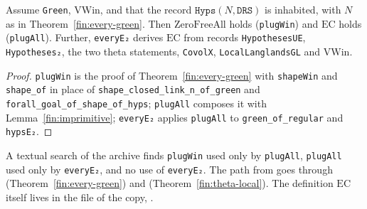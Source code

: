 \begin{theorem}\label{fin:plug}
Assume \texttt{Green}, $\mathrm{VWin}$, and that the record
$\texttt{Hyps}(N,\texttt{DRS})$ is inhabited, with $N$ as in
Theorem~\ref{fin:every-green}. Then $\mathrm{ZeroFreeAll}$ holds
(\texttt{plugWin}) and $\mathrm{EC}$ holds (\texttt{plugAll}). Further,
\texttt{everyE₂} derives $\mathrm{EC}$ from records \texttt{HypothesesUE},
\texttt{Hypotheses₂}, the two theta statements, \texttt{CovolX},
\texttt{LocalLanglandsGL} and $\mathrm{VWin}$.
\end{theorem}
\begin{proof}
\texttt{plugWin} is the proof of Theorem~\ref{fin:every-green} with
\texttt{shapeWin} and \texttt{shape\_of} in place of
\texttt{shape\_closed\_link\_n\_of\_green} and
\texttt{forall\_goal\_of\_shape\_of\_hyps}; \texttt{plugAll} composes it with
Lemma~\ref{fin:imprimitive}; \texttt{everyE₂} applies \texttt{plugAll} to
\texttt{green\_of\_regular} and \texttt{hypsE₂}.
\end{proof}

\begin{remark}\label{fin:rem-deadcopy}
A textual search of the archive finds \texttt{plugWin} used only by
\texttt{plugAll}, \texttt{plugAll} used only by \texttt{everyE₂}, and no use of
\texttt{everyE₂}. The path from  goes through
 (Theorem~\ref{fin:every-green}) and
(Theorem~\ref{fin:theta-local}). The definition $\mathrm{EC}$ itself lives in
the file of the copy, .
\end{remark}
